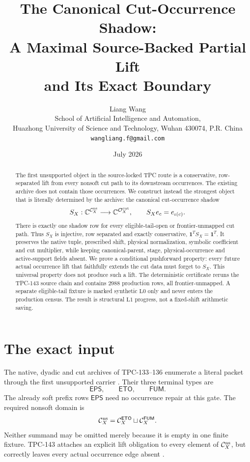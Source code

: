 \documentclass[11pt]{article}
\title{\textbf{The Canonical Cut-Occurrence Shadow:}\\
\textbf{A Maximal Source-Backed Partial Lift}\\
\textbf{and Its Exact Boundary}}
\author{Liang Wang\\
School of Artificial Intelligence and Automation,\\
Huazhong University of Science and Technology, Wuhan 430074, P.R. China\\
\texttt{wangliang.f@gmail.com}}
\date{July 2026}
\theoremstyle{definition}
\theoremstyle{remark}
\newcommand{\ETO}{\mathsf{ETO}}
\newcommand{\FUM}{\mathsf{FUM}}
\newcommand{\EPS}{\mathsf{EPS}}
\newcommand{\Cns}{\mathcal C_X^{\rm ns}}
\begin{document}
\maketitle

\begin{abstract}
The first unsupported object in the source-locked TPC route is a
conservative, row-separated lift from every nonsoft cut path to its
downstream occurrences.  The existing archive does not contain those
occurrences.  We construct instead the strongest object that is
literally determined by the archive: the canonical cut-occurrence
shadow
\[
 S_X:\mathbb C^{\mathcal C_X^{\rm ns}}
 \longrightarrow\mathbb C^{\mathcal O_X^{\rm cut}},
 \qquad S_Xe_c=e_{\iota(c)}.
\]
There is exactly one shadow row for every eligible-tail-open or
frontier-unmapped cut path.  Thus \(S_X\) is injective, row separated
and exactly conservative, \(\mathbf1^TS_X=\mathbf1^T\).  It preserves
the native tuple, prescribed shift, physical normalization, symbolic
coefficient and cut multiplier, while keeping canonical-parent,
stage, physical-occurrence and active-support fields absent.  We
prove a conditional pushforward property: every future actual
occurrence lift that faithfully extends the cut data must forget to
\(S_X\).  This universal property does not produce such a lift.
The deterministic certificate reruns the TPC-143 source chain and
contains \(2988\) production rows, all frontier-unmapped.  A separate
eligible-tail fixture is marked synthetic \(\mathrm{L0}\) only and
never enters the production census.  The result is structural
\(\mathrm{L1}\) progress, not a fixed-shift arithmetic saving.
\end{abstract}

\section{The exact input}

The native, dyadic and cut archives of TPC-133--136 enumerate a
literal packet through the first unsupported carrier
\citep{WangTPC133,WangTPC134,WangTPC135,WangTPC136}.  Their three
terminal types are
\[
 \EPS,\qquad \ETO,\qquad \FUM.
\]
The already soft prefix rows \(\EPS\) need no occurrence repair at
this gate.  The required nonsoft domain is
\begin{equation}
 \Cns=\mathcal C_X^{\ETO}\sqcup\mathcal C_X^{\FUM}.
 \label{eq:nonsoft-domain}
\end{equation}
Neither summand may be omitted merely because it is empty in one
finite fixture.  TPC-143 attaches an explicit lift obligation to
every element of \(\Cns\), but correctly leaves every actual
occurrence edge absent \citep{WangTPC143}.
\end{document}
